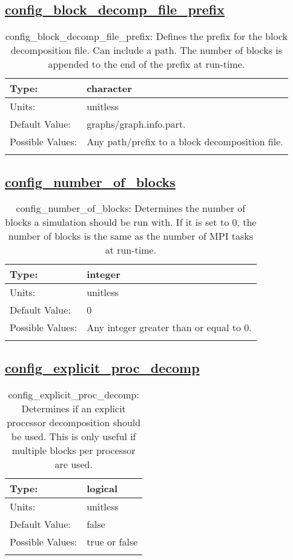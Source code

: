\subsection[config\_block\_decomp\_file\_prefix]{\hyperref[sec:nm_tab_decomposition]{config\_block\_decomp\_file\_prefix}}
\label{subsec:nm_sec_config_block_decomp_file_prefix}
\begin{center}
\begin{longtable}{| p{2.0in} || p{4.0in} |}
    \hline
    Type: & character \\
    \hline
    Units: & \si{unitless} \\
    \hline
    Default Value: & graphs/graph.info.part. \\
    \hline
    Possible Values: & Any path/prefix to a block decomposition file. \\
    \hline
    \caption{config\_block\_decomp\_file\_prefix: Defines the prefix for the block decomposition file. Can include a path. The number of blocks is appended to the end of the prefix at run-time.}
\end{longtable}
\end{center}
\subsection[config\_number\_of\_blocks]{\hyperref[sec:nm_tab_decomposition]{config\_number\_of\_blocks}}
\label{subsec:nm_sec_config_number_of_blocks}
\begin{center}
\begin{longtable}{| p{2.0in} || p{4.0in} |}
    \hline
    Type: & integer \\
    \hline
    Units: & \si{unitless} \\
    \hline
    Default Value: & 0 \\
    \hline
    Possible Values: & Any integer greater than or equal to 0. \\
    \hline
    \caption{config\_number\_of\_blocks: Determines the number of blocks a simulation should be run with. If it is set to 0, the number of blocks is the same as the number of MPI tasks at run-time.}
\end{longtable}
\end{center}
\subsection[config\_explicit\_proc\_decomp]{\hyperref[sec:nm_tab_decomposition]{config\_explicit\_proc\_decomp}}
\label{subsec:nm_sec_config_explicit_proc_decomp}
\begin{center}
\begin{longtable}{| p{2.0in} || p{4.0in} |}
    \hline
    Type: & logical \\
    \hline
    Units: & \si{unitless} \\
    \hline
    Default Value: & false \\
    \hline
    Possible Values: & true or false \\
    \hline
    \caption{config\_explicit\_proc\_decomp: Determines if an explicit processor decomposition should be used. This is only useful if multiple blocks per processor are used.}
\end{longtable}
\end{center}
